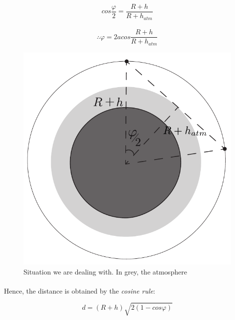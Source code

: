 \begin{equation}
cos \frac{\varphi}{2} = \frac{R+h}{R+h_{atm}}
\end{equation}\\
\begin{equation}
\therefore \varphi = 2acos \frac{R+h}{R+h_{atm}}
\end{equation}

\begin{figure}[H]
\centering
\includegraphics[scale=0.6]{./sections/3_Constellation/img/diagram.pdf}
\caption{Situation we are dealing with. In grey, the atmosphere}
\label{diagram}
\end{figure}

\paragraph{}Hence, the distance is obtained by the \textit{cosine rule}:

\begin{equation}
d = (R+h)\sqrt{2(1-cos \varphi)}
\end{equation}


